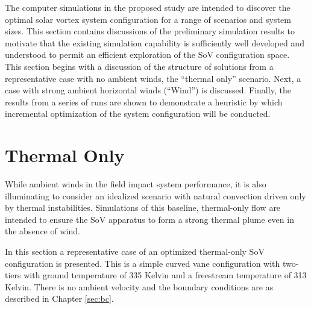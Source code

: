 \label{sec:results}

%
%
%
%

The computer simulations in the proposed study are intended to discover
the optimal solar vortex system configuration for a range of scenarios
and system sizes. This section contains discussions of the preliminary
simulation results to motivate that the existing simulation capability
is sufficiently well developed and understood to permit an efficient
exploration of the SoV configuration space. 
This section begins with a discussion of the structure of solutions from
a representative case with no ambient winds, the ``thermal only''
scenario. Next, a case with strong ambient horizontal winds (``Wind'')
is discussed. Finally, the results from a series of runs are shown to
demonstrate a heuristic by which incremental optimization of the system
configuration will be conducted.



\section{Thermal Only}

While ambient winds in the field impact system performance, it is
also illuminating to consider an idealized scenario with natural convection
driven only by thermal instabilities. Simulations of this baseline,
thermal-only flow are intended to ensure the SoV apparatus to form a
strong thermal plume even in the absence of wind. 

In this section a representative case of an optimized thermal-only SoV
configuration is presented. This is a simple curved vane configuration with
two-tiers with ground temperature of 335 Kelvin and a freestream
temperature of 313 Kelvin. There is no ambient velocity and the boundary
conditions are as described in Chapter \ref{sec:bc}. 

